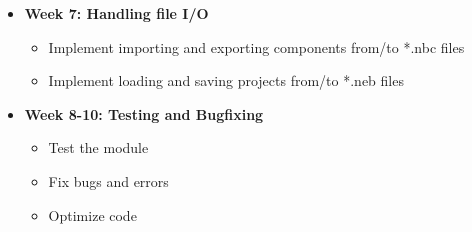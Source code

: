 \documentclass[12pt,a4paper]{article}
\begin{document}
\begin{itemize}
    \item \textbf{Week 7: Handling file I/O}
    \begin{itemize}
        \item Implement importing and exporting components from/to *.nbc files
        \item Implement loading and saving projects from/to *.neb files
    \end{itemize}
    
    \item \textbf{Week 8-10: Testing and Bugfixing}
    \begin{itemize}
        \item Test the module
        \item Fix bugs and errors
        \item Optimize code
    \end{itemize}
\end{itemize}
\end{document}
